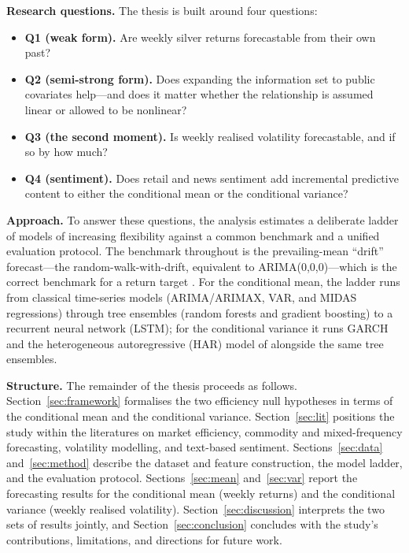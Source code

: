 \documentclass[12pt, a4paper]{article}
\begin{document}
\textbf{Research questions.} The thesis is built around four questions:
\begin{itemize}
    \item \textbf{Q1 (weak form).} Are weekly silver returns forecastable from their
    own past?
    \item \textbf{Q2 (semi-strong form).} Does expanding the information set to public
    covariates help---and does it matter whether the relationship is assumed linear or
    allowed to be nonlinear?
    \item \textbf{Q3 (the second moment).} Is weekly realised volatility forecastable,
    and if so by how much?
    \item \textbf{Q4 (sentiment).} Does retail and news sentiment add incremental
    predictive content to either the conditional mean or the conditional variance?
\end{itemize}

\textbf{Approach.} To answer these questions, the analysis estimates a deliberate ladder
of models of increasing flexibility against a common benchmark and a unified evaluation
protocol. The benchmark
throughout is the prevailing-mean ``drift'' forecast---the random-walk-with-drift,
equivalent to ARIMA(0,0,0)---which is the correct benchmark for a return target
\parencite{welch2008,campbell2008}. For the conditional mean, the ladder runs from
classical time-series models (ARIMA/ARIMAX, VAR, and MIDAS regressions) through tree
ensembles (random forests and gradient boosting) to a recurrent neural network (LSTM);
for the conditional variance it runs GARCH and the heterogeneous autoregressive (HAR)
model of \textcite{corsi2009} alongside the same tree ensembles.

\textbf{Structure.} The remainder of the thesis proceeds as follows.
Section~\ref{sec:framework} formalises the two efficiency null hypotheses in terms of the conditional
mean and the conditional variance. Section~\ref{sec:lit} positions the study within the
literatures on market efficiency, commodity and mixed-frequency forecasting, volatility
modelling, and text-based sentiment. Sections~\ref{sec:data} and~\ref{sec:method} describe
the dataset and feature construction, the model ladder, and the evaluation protocol.
Sections~\ref{sec:mean} and~\ref{sec:var} report the forecasting results for the conditional
mean (weekly returns) and the conditional variance (weekly realised volatility).
Section~\ref{sec:discussion} interprets the two sets of results jointly, and
Section~\ref{sec:conclusion} concludes with the study's contributions, limitations, and
directions for future work.
\end{document}
